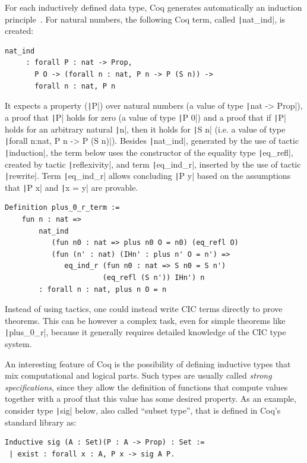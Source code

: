 \documentclass[review]{elsarticle}
\newcommand{\coq}[1]{\texttt|#1|}
\theoremstyle{definition}
\begin{document}
For each inductively defined data type,
Coq generates automatically an induction principle~\cite[Chapter
14]{Bertot2010}. For natural numbers, the following Coq term, called
\coq{nat_ind}, is created: 
\begin{verbatim}
nat_ind
     : forall P : nat -> Prop,
       P O -> (forall n : nat, P n -> P (S n)) ->
       forall n : nat, P n
\end{verbatim}
It expects a property (\coq{P}) over natural numbers (a value of type
\coq{nat -> Prop}), a proof that \coq{P} holds for zero (a value of
type \coq{P 0}) and a proof that if \coq{P} holds for an arbitrary
natural \coq{n}, then it holds for \coq{S n} (i.e. a value of type
\coq{forall n:nat, P n -> P (S n)}). Besides \coq{nat_ind}, generated by
the use of tactic \coq{induction}, the term below 
uses the constructor of the equality
type \coq{eq_refl}, created by tactic \coq{reflexivity}, and term
\coq{eq_ind_r}, inserted by the use of tactic \coq{rewrite}. Term
\coq{eq_ind_r} allows concluding \coq{P y} based on the assumptions
that \coq{P x} and \coq{x = y} are provable.

\begin{verbatim}
Definition plus_0_r_term :=
	fun n : nat =>
		nat_ind
		   (fun n0 : nat => plus n0 O = n0) (eq_refl O)
		   (fun (n' : nat) (IHn' : plus n' O = n') =>
		      eq_ind_r (fun n0 : nat => S n0 = S n')
		               (eq_refl (S n')) IHn') n
		: forall n : nat, plus n O = n
\end{verbatim}  

Instead of using tactics, one could instead write CIC terms directly
to prove theorems.  This can be however a complex task, even for
simple theorems like \coq{plus_0_r}, because it generally requires
detailed knowledge of the CIC type system.

An interesting feature of Coq is the possibility of defining inductive
types that mix computational and logical parts. Such types are usually
called \emph{strong specifications}, since they allow the definition
of functions that compute values together with a proof that this value
has some desired property. As an example, consider type \coq{sig}
below, also called ``subset type'', that is defined in Coq's standard
library as:
\begin{verbatim}
Inductive sig (A : Set)(P : A -> Prop) : Set :=
 | exist : forall x : A, P x -> sig A P.
\end{verbatim}
\end{document}
